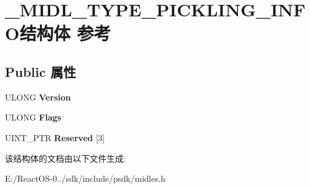 \hypertarget{struct___m_i_d_l___t_y_p_e___p_i_c_k_l_i_n_g___i_n_f_o}{}\section{\+\_\+\+M\+I\+D\+L\+\_\+\+T\+Y\+P\+E\+\_\+\+P\+I\+C\+K\+L\+I\+N\+G\+\_\+\+I\+N\+F\+O结构体 参考}
\label{struct___m_i_d_l___t_y_p_e___p_i_c_k_l_i_n_g___i_n_f_o}
\subsection*{Public 属性}
\begin{DoxyCompactItemize}
\item 
\mbox{\label{struct___m_i_d_l___t_y_p_e___p_i_c_k_l_i_n_g___i_n_f_o_a065afbf16f5f4665a9a2cbeb4ffcffcd}} 
U\+L\+O\+NG {\bfseries Version}
\item 
\mbox{\label{struct___m_i_d_l___t_y_p_e___p_i_c_k_l_i_n_g___i_n_f_o_a82b71ac0307d78a75456e9f264a03b9b}} 
U\+L\+O\+NG {\bfseries Flags}
\item 
\mbox{\label{struct___m_i_d_l___t_y_p_e___p_i_c_k_l_i_n_g___i_n_f_o_ac89734e2c3bbb2c332261a30accdad7e}} 
U\+I\+N\+T\+\_\+\+P\+TR {\bfseries Reserved} \mbox{[}3\mbox{]}
\end{DoxyCompactItemize}


该结构体的文档由以下文件生成\+:\begin{DoxyCompactItemize}
\item 
E\+:/\+React\+O\+S-\/0../sdk/include/psdk/midles.\+h\end{DoxyCompactItemize}
